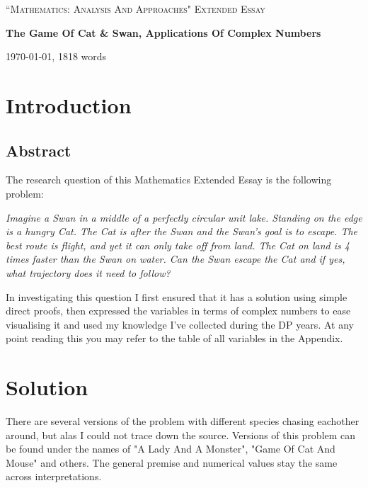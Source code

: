 \documentclass[12pt]{article}
\begin{document}
\begin{titlepage}
	\centering
	\vspace{1cm}
	{\Large \textsc{``Mathematics: Analysis And Approaches" Extended Essay}\par}
	\vspace{1.5cm}
	{\huge\bfseries The Game Of Cat \& Swan, Applications Of Complex Numbers\par}
	\vspace{2cm}
	\vfill
	\vfill
	{\large \today, 1818 words\par}
\end{titlepage}

\clearpage
{}
\tableofcontents
\newpage


\section{Introduction}
\subsection{Abstract}
The research question of this Mathematics Extended Essay is the following problem:

\emph{Imagine a Swan in a middle of a perfectly circular unit lake. Standing on the edge is a hungry Cat. The Cat is after the Swan and the Swan's goal is to escape. The best route is flight, and yet it can only take off from land. The Cat on land is 4 times faster than the Swan on water. Can the Swan escape the Cat and if yes, what trajectory does it need to follow?}

In investigating this question I first ensured that it has a solution using simple direct proofs, then expressed the variables in terms of complex numbers to ease visualising it and used my knowledge I've collected during the DP years. At any point reading this you may refer to the table of all variables in the Appendix.

\section{Solution}
There are several versions of the problem with different species chasing eachother around, but alas I could not trace down the source. Versions of this problem can be found under the names of "A Lady And A Monster"\cite{ladyandmonster}, "Game Of Cat And Mouse"\cite{Catandmouse} and others. The general premise and numerical values stay the same across interpretations. 
\end{document}
